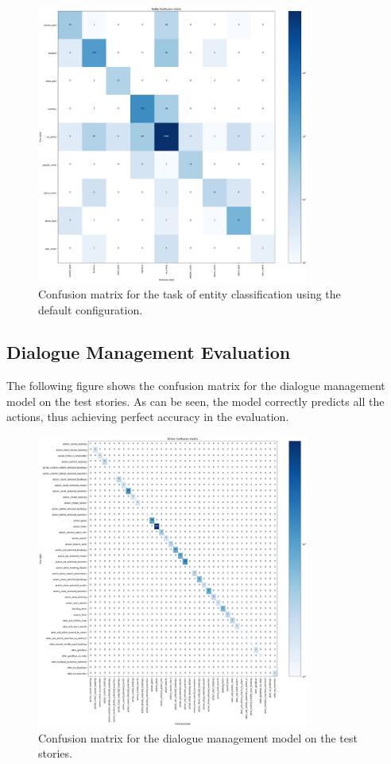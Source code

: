 \documentclass[twocolumn]{article}
\begin{document}
\begin{figure}[H]
    \centering
    \includegraphics[width=0.8\textwidth]{images/entity_default_cf.png}
    \caption{Confusion matrix for the task of entity classification using the default configuration.}
    \label{fig:entity-default-cf}
\end{figure}

\newpage

\subsection{Dialogue Management Evaluation}

The following figure shows the confusion matrix for the dialogue management model on the test stories. As can be seen, the model correctly predicts all the actions, thus achieving perfect accuracy in the evaluation.

\begin{figure}[h!]
    \centering
    \includegraphics[width=0.8\textwidth]{images/dialogue_cf.png}
    \caption{Confusion matrix for the dialogue management model on the test stories.}
    \label{fig:dialogue-cf}
\end{figure}
\end{document}
